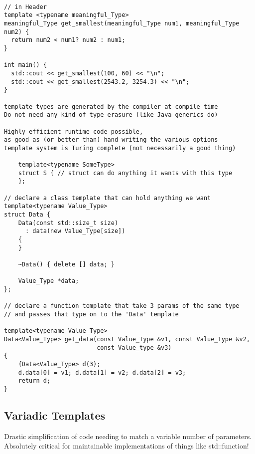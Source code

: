 \begin{verbatim}

// in Header
template <typename meaningful_Type>
meaningful_Type get_smallest(meaningful_Type num1, meaningful_Type num2) {
  return num2 < num1? num2 : num1;
}

int main() {
  std::cout << get_smallest(100, 60) << "\n";
  std::cout << get_smallest(2543.2, 3254.3) << "\n";
}

template types are generated by the compiler at compile time
Do not need any kind of type-erasure (like Java generics do)

Highly efficient runtime code possible, 
as good as (or better than) hand writing the various options
template system is Turing complete (not necessarily a good thing)

    template<typename SomeType>
    struct S { // struct can do anything it wants with this type
    };

// declare a class template that can hold anything we want
template<typename Value_Type>
struct Data {
    Data(const std::size_t size)
      : data(new Value_Type[size])
    {
    }

    ~Data() { delete [] data; }

    Value_Type *data;
};

// declare a function template that take 3 params of the same type
// and passes that type on to the 'Data' template

template<typename Value_Type>
Data<Value_Type> get_data(const Value_Type &v1, const Value_Type &v2,
                          const Value_type &v3)
{
    {Data<Value_Type> d(3);
    d.data[0] = v1; d.data[1] = v2; d.data[2] = v3;
    return d;
}
\end{verbatim}

\subsection{Variadic Templates}

Drastic simplification of code needing to match a variable number of parameters.
Absolutely critical for maintainable implementations of things like std::function!

